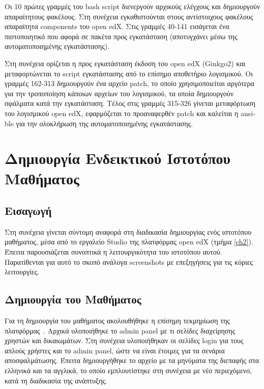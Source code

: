 \documentclass[12pt]{report}
\begin{document}
Οι 10 πρώτες γραμμές του \textlatin{bash script} διενεργούν αρχικούς ελέγχους και δημιουργούν απαραίτητους φακέλους. Στη συνέχεια εγκαθιστούνται στους αντίστοιχους φακέλους απαραίτητα \textlatin{components} του \textlatin{open edX}. Στις γραμμές 40-141 εισάγεται ένα πιστοποιητικό που αφορά σε πακέτα προς εγκατάσταση (αποτυγχάνει μέσω της αυτοματοποιημένης εγκατάστασης).

Στη συνέχεια ορίζεται η προς εγκατάσταση έκδοση του \textlatin{open edX (Ginkgo2)} και μεταφορτώνεται το \textlatin{script} εγκατάστασης από το επίσημο αποθετήριο λογισμικού. Οι γραμμές 162-313 δημιουργούν ένα αρχείο \textlatin{patch}, το οποίο χρησιμοποιείται αργότερα για την τροποποίηση κάποιων αρχείων του λογισμικού, τα οποία δημιουργούν σφάλματα κατά την εγκατάσταση. Τέλος στις γραμμές 315-326 γίνεται μεταφόρτωση του λογισμικού \textlatin{open edX}, εφαρμόζεται το προαναφερθέν \textlatin{patch} και καλείται η \textlatin{ansible} για την ολοκλήρωση της αυτοματοποιημένης εγκατάστασης.

\chapter{Δημιουργία Ενδεικτικού Ιστοτόπου Μαθήματος}\label{ch4}
\section{Εισαγωγή}
Στη συνέχεια γίνεται σύντομη αναφορά στη διαδικασία δημιουργίας ενός ιστοτόπου μαθήματος, μέσα από το εργαλείο \textlatin{Studio} της πλατφόρμας \textlatin{open edX} (τμήμα \ref{ch2}). Έπειτα παρουσιάζεται συνοπτικά η λειτουργικότητα του ιστοτόπου αυτού. Παρατίθενται για αυτό το σκοπό ανάλογα \textlatin{screenshots} με επεξηγήσεις για τις κύριες λειτουργίες.

\section{Δημιουργία του Μαθήματος}
Για τη δημιουργία του μαθήματος ακολουθήθηκε η επίσημη τεκμηρίωση της πλατφόρμας~\cite{edxdata_package_1}.
Αρχικά υλοποιήθηκε το \textlatin{admin panel} με τι σελίδες διαχείρησης χρηστών και δικαιωμάτων. Στη συνέχεια υλοποιήθηκαν οι σελίδες \textlatin{login} για τους απλούς χρήστες και το \textlatin{admin panel}, ώστε να είναι έτοιμες για τα σενάρια αποσφαλμάτωσης. Έπειτα δημιουργήθηκε το αρχείο με τα μηνύματα της διεπαφής στα ελληνικά και τα αγγλικά, το οποίο εμπλουτίστηκε στη συνέχεια με νέο περιεχόμενο, κατά τη διαδικασία της ανάπτυξης.
\end{document}
